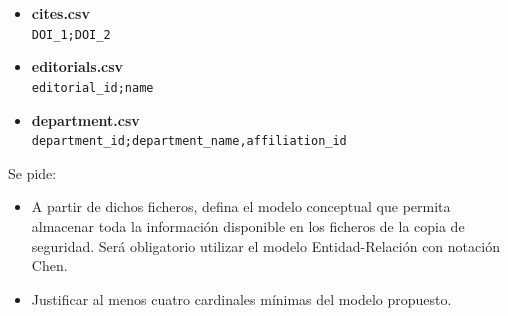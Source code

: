 \documentclass[12pt,a4paper,addpoints,answers]{exam}
\begin{document}
\begin{questions}
\begin{itemize}
    \item \textbf{cites.csv} \vspace{0.5em} \\
    \texttt{DOI\_1;DOI\_2\\
    }
    
    \item \textbf{editorials.csv} \vspace{0.5em} \\
    \texttt{editorial\_id;name\\
    }
    
    \item \textbf{department.csv} \vspace{0.5em} \\
    \texttt{department\_id;department\_name,affiliation\_id\\
    }

\end{itemize}

Se pide: 

\begin{itemize}
    \item A partir de dichos ficheros, defina el modelo conceptual que permita almacenar toda la información disponible en los ficheros de la copia de seguridad. Será obligatorio utilizar el modelo Entidad-Relación con notación Chen.
    \item Justificar al menos cuatro cardinales mínimas del modelo propuesto.
\end{itemize}



\end{questions}
\end{document}
